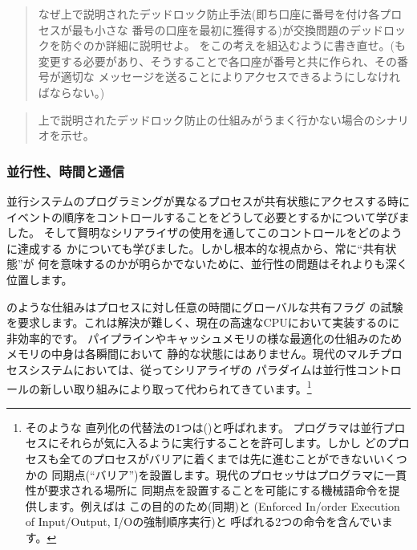 \begin{quote}
なぜ上で説明されたデッドロック防止手法(即ち口座に番号を付け各プロセスが最も小さな
番号の口座を最初に獲得する)が交換問題のデッドロックを防ぐのか詳細に説明せよ。
をこの考えを組込むように書き直せ。(も
変更する必要があり、そうすることで各口座が番号と共に作られ、その番号が適切な
メッセージを送ることによりアクセスできるようにしなければならない。)
\end{quote}

\begin{quote}
上で説明されたデッドロック防止の仕組みがうまく行かない場合のシナリオを示せ。

\end{quote}

\subsubsection*{並行性、時間と通信}



並行システムのプログラミングが異なるプロセスが共有状態にアクセスする時に
イベントの順序をコントロールすることをどうして必要とするかについて学びました。
そして賢明なシリアライザの使用を通してこのコントロールをどのように達成する
かについても学びました。しかし根本的な視点から、常に``共有状態''が
何を意味するのかが明らかでないために、並行性の問題はそれよりも深く位置します。



のような仕組みはプロセスに対し任意の時間にグローバルな共有フラグ
の試験を要求します。これは解決が難しく、現在の高速なCPUにおいて実装するのに非効率的です。
パイプラインやキャッシュメモリの様な最適化の仕組みのためメモリの中身は各瞬間において
静的な状態にはありません。現代のマルチプロセスシステムにおいては、従ってシリアライザの
パラダイムは並行性コントロールの新しい取り組みにより取って代わられてきています。\footnote{そのような
直列化の代替法の1つは()と呼ばれます。
プログラマは並行プロセスにそれらが気に入るように実行することを許可します。しかし
どのプロセスも全てのプロセスがバリアに着くまでは先に進むことができないいくつかの
同期点(``バリア'')を設置します。現代のプロセッサはプログラマに一貫性が要求される場所に
同期点を設置することを可能にする機械語命令を提供します。例えばは
この目的のため(同期)と
(Enforced In\-/order Execution of Input/Output, I/Oの強制順序実行)と
呼ばれる2つの命令を含んでいます。}



